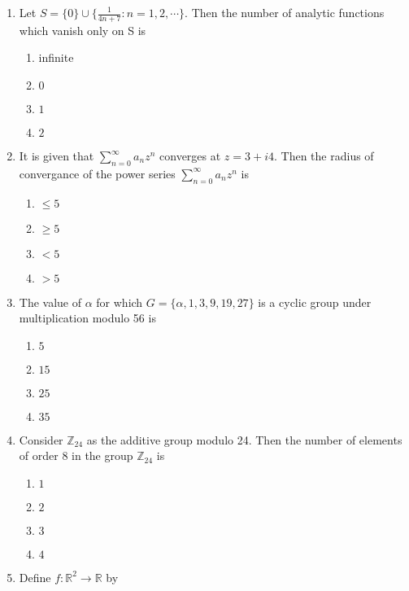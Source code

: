 \documentclass[journal,12pt,twocolumn]{IEEEtran}
\theoremstyle{remark}
\begin{document}
\begin{enumerate}
\item Let $S=\{0\}\cup \{\frac{1}{4n+7}:n=1,2,\cdots\}$. Then the number of analytic functions which vanish only on S is
\begin{multicols}{2}
\begin{enumerate}
    \item infinite
    \item $0$
    \item $1$
    \item $2$
\end{enumerate}    
\end{multicols}
\item It is given that $\sum_{n=0}^{\infty}a_n z^n$ converges at $z=3+i4$. Then the radius of convergance of the power series $\sum_{n=0}^{\infty}a_n z^n$ is 
\begin{multicols}{2}
\begin{enumerate}
    \item $\leq 5$
    \item $\geq 5$
    \item $<5$
    \item $>5$
\end{enumerate}    
\end{multicols}
\item The value of $\alpha$ for which $G=\{\alpha,1,3,9,19,27\}$ is a cyclic group under multiplication modulo 56 is 
\begin{multicols}{2}
\begin{enumerate}
    \item $5$
    \item $15$
    \item $25$
    \item $35$
\end{enumerate}    
\end{multicols}
\item Consider $\mathbb{Z}_{24}$ as the additive group modulo 24. Then the number of elements of order 8 in the group $\mathbb{Z}_{24}$ is
\begin{multicols}{2}
\begin{enumerate}
   \item $1$
    \item $2$
    \item $3$
    \item $4$
\end{enumerate}    
\end{multicols}
\item Define $f:\mathbb{R}^2\rightarrow \mathbb{R}$ by

\end{enumerate}
\end{document}
